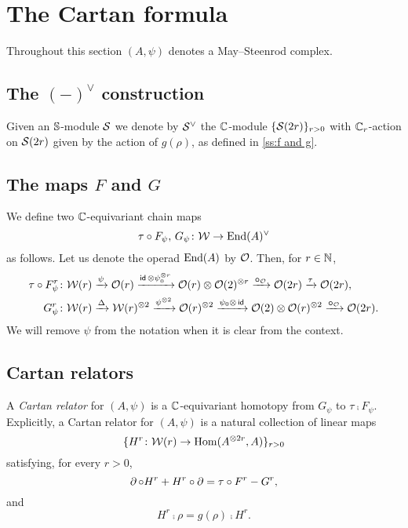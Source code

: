 
\section{The Cartan formula}\label{s:cartan}

Throughout this section $(A,\psi)$ denotes a May--Steenrod complex.

\subsection{The $(-)^\vee$ construction}

Given an $\mathbb{S}$-module $\mathcal{S}$ we denote by $\mathcal{S}^\vee$ the $\mathbb{C}$-module $\{\mathcal{S}(2r)\}_{r>0}$ with $\mathbb{C}_r$-action on $\mathcal{S}(2r)$ given by the action of $g(\rho)$, as defined in \cref{ss:f and g}.

\subsection{The maps $F$ and $G$}

We define two $\mathbb{C}$-equivariant chain maps
\[
\tau \mathbin{\circ} F_\psi,\, G_\psi \colon \mathcal{W} \to \mathrm{End}(A)^\vee
\]
as follows.
Let us denote the operad $\mathrm{End}(A)$ by $\mathcal{O}$.
Then, for $r \in \mathbb{N}$,
\begin{align*}
	\tau \mathbin{\circ} F_\psi^r \colon& \mathcal{W}(r) \xrightarrow{\psi} \mathcal{O}(r) \xrightarrow{\mathsf{id}\, \otimes \psi_0^{\otimes r}}
	\mathcal{O}(r) \otimes \mathcal{O}(2)^{\otimes r} \xrightarrow{\bm{\mathbin{\circ}}_{\mathcal{O}}}
	\mathcal{O}(2r) \xrightarrow{\tau} \mathcal{O}(2r), \\
	G_\psi^r \colon& \mathcal{W}(r) \xrightarrow{\Delta}
	\mathcal{W}(r)^{\otimes 2} \xrightarrow{\psi^{\otimes 2}}
	\mathcal{O}(r)^{\otimes 2} \xrightarrow{\psi_0 \otimes\, \mathsf{id}}
	\mathcal{O}(2) \otimes \mathcal{O}(r)^{\otimes 2} \xrightarrow{\bm{\mathbin{\circ}}_{\mathcal{O}}}
	\mathcal{O}(2r).
\end{align*}
We will remove $\psi$ from the notation when it is clear from the context.

\subsection{Cartan relators}\label{ss:cartan_relators}

A \textit{Cartan relator} for $(A,\psi)$ is a $\mathbb{C}$-equivariant homotopy from $G_\psi$ to $\tau \comp F_\psi$.
Explicitly, a Cartan relator for $(A,\psi)$ is a natural collection of linear maps
\[
\{H^r \colon \mathcal{W}(r) \to \mathrm{Hom}(A^{\otimes 2r}, A)\}_{r>0}
\]
satisfying, for every $r > 0$,
\[
\operatorname{\partial} \mathbin{\circ} H^r + H^r \mathbin{\circ} \operatorname{\partial} = \tau \mathbin{\circ} F^r - G^r,
\]
and
\[
H^r \comp \rho = g(\rho) \comp H^r.
\]

